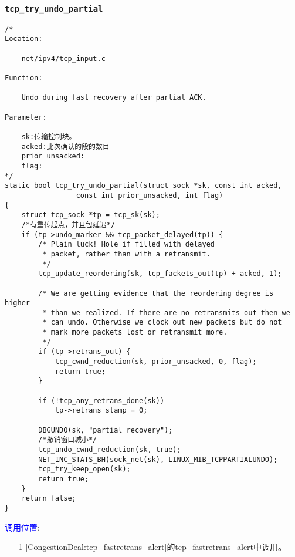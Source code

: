 		\subsubsection{\texttt{tcp_try_undo_partial}}
			\label{CongestionControlWindowUndo:tcp_try_undo_partial}
\begin{verbatim}
/* 
Location:

    net/ipv4/tcp_input.c

Function:

    Undo during fast recovery after partial ACK.

Parameter:

    sk:传输控制块。
	acked:此次确认的段的数目
	prior_unsacked:
	flag:
*/
static bool tcp_try_undo_partial(struct sock *sk, const int acked,
				 const int prior_unsacked, int flag)
{
	struct tcp_sock *tp = tcp_sk(sk);
	/*有重传起点，并且包延迟*/
	if (tp->undo_marker && tcp_packet_delayed(tp)) {
		/* Plain luck! Hole if filled with delayed
		 * packet, rather than with a retransmit.
		 */
		tcp_update_reordering(sk, tcp_fackets_out(tp) + acked, 1);

		/* We are getting evidence that the reordering degree is higher
		 * than we realized. If there are no retransmits out then we
		 * can undo. Otherwise we clock out new packets but do not
		 * mark more packets lost or retransmit more.
		 */
		if (tp->retrans_out) {
			tcp_cwnd_reduction(sk, prior_unsacked, 0, flag);
			return true;
		}

		if (!tcp_any_retrans_done(sk))
			tp->retrans_stamp = 0;

		DBGUNDO(sk, "partial recovery");
		/*撤销窗口减小*/
		tcp_undo_cwnd_reduction(sk, true);
		NET_INC_STATS_BH(sock_net(sk), LINUX_MIB_TCPPARTIALUNDO);
		tcp_try_keep_open(sk);
		return true;
	}
	return false;
}
\end{verbatim}

        \textcolor{blue}{调用位置}:

            \begin{enumerate}
            	\item[1]        \ref{CongestionDeal:tcp_fastretrans_alert}的tcp\_fastretrans\_alert中调用。
            \end{enumerate}

